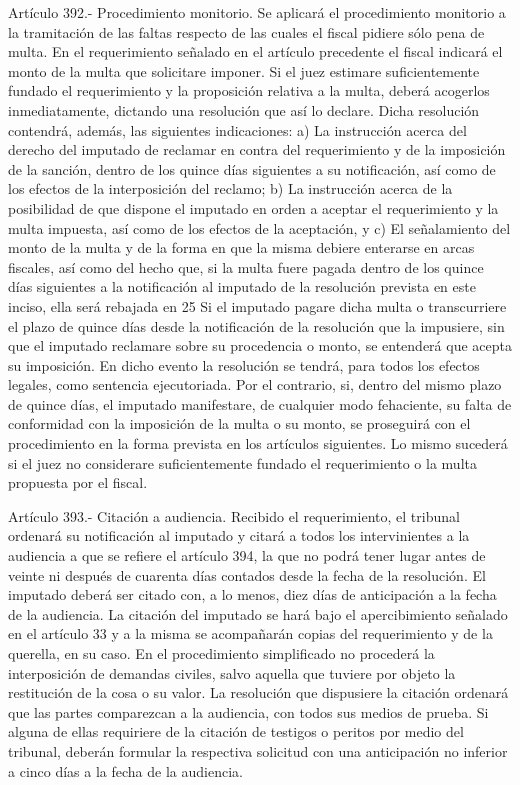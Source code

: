     Artículo 392.- Procedimiento monitorio. Se aplicará el procedimiento monitorio a la tramitación de las faltas respecto de las cuales el fiscal pidiere sólo pena de multa. En el requerimiento señalado en el artículo precedente el fiscal indicará el monto de la multa que solicitare imponer.
    Si el juez estimare suficientemente fundado el requerimiento y la proposición relativa a la multa, deberá acogerlos inmediatamente, dictando una resolución que así lo declare. Dicha resolución contendrá, además, las siguientes indicaciones:
    a) La instrucción acerca del derecho del imputado de reclamar en contra del requerimiento y de la imposición de la sanción, dentro de los quince días siguientes a su notificación, así como de los efectos de la interposición del reclamo;
    b) La instrucción acerca de la posibilidad de que dispone el imputado en orden a aceptar el requerimiento y la multa impuesta, así como de los efectos de la aceptación, y
    c) El señalamiento del monto de la multa y de la forma en que la misma debiere enterarse en arcas fiscales, así como del hecho que, si la multa fuere pagada dentro de los quince días siguientes a la notificación al imputado de la resolución prevista en este inciso, ella será rebajada en 25%
    Si el imputado pagare dicha multa o transcurriere el plazo de quince días desde la notificación de la resolución que la impusiere, sin que el imputado reclamare sobre su procedencia o monto, se entenderá que acepta su imposición. En dicho evento la resolución se tendrá, para todos los efectos legales, como sentencia ejecutoriada.
    Por el contrario, si, dentro del mismo plazo de quince días, el imputado manifestare, de cualquier modo fehaciente, su falta de conformidad con la imposición de la multa o su monto, se proseguirá con el procedimiento en la forma prevista en los artículos siguientes. Lo mismo sucederá si el juez no considerare suficientemente fundado el requerimiento o la multa propuesta por el fiscal.

    Artículo 393.- Citación a audiencia. Recibido el requerimiento, el tribunal ordenará su notificación al imputado y citará a todos los intervinientes a la audiencia a que se refiere el artículo 394, la que no podrá tener lugar antes de veinte ni después de cuarenta días contados desde la fecha de la resolución. El imputado deberá ser citado con, a lo menos, diez días de anticipación a la fecha de la audiencia. La citación del imputado se hará bajo el apercibimiento señalado en el artículo 33 y a la misma se acompañarán copias del requerimiento y de la querella, en su caso.
    En el procedimiento simplificado no procederá la interposición de demandas civiles, salvo aquella que tuviere por objeto la restitución de la cosa o su valor.
    La resolución que dispusiere la citación ordenará que las partes comparezcan a la audiencia, con todos sus medios de prueba. Si alguna de ellas requiriere de la citación de testigos o peritos por medio del tribunal, deberán formular la respectiva solicitud con una anticipación no inferior a cinco días a la fecha de la audiencia.

